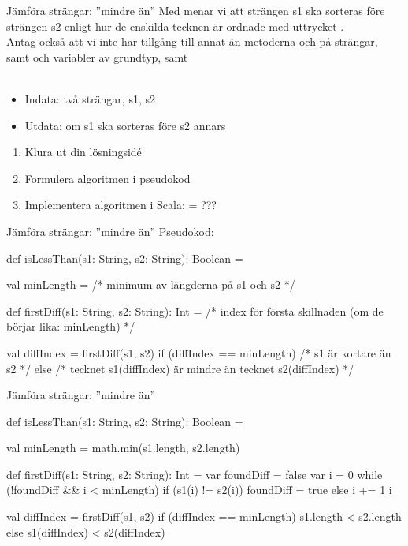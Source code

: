 \begin{Slide}{Jämföra strängar: ''mindre än''}\SlideFontSmall
Med  menar vi att strängen s1 ska sorteras före strängen s2 enligt hur de enskilda tecknen är ordnade med uttrycket . \\
Antag också att vi inte har tillgång till annat än metoderna  och  på strängar, samt   och variabler av grundtyp, samt 
\\\\
\begin{itemize}
\item Indata: två strängar, s1, s2
\item Utdata:  om s1 ska sorteras före s2 annars 
\end{itemize}
\begin{enumerate}
\item Klura ut din lösningsidé
\item Formulera algoritmen i pseudokod
\item Implementera algoritmen i Scala:  = ???
\end{enumerate}
\end{Slide}

\begin{Slide}{Jämföra strängar: ''mindre än''}\SlideFontSmall
Pseudokod:
\begin{Code}
def isLessThan(s1: String, s2: String): Boolean = {

  val minLength = /* minimum av längderna på s1 och s2 */

  def firstDiff(s1: String, s2: String): Int =
    /* index för första skillnaden (om de börjar lika: minLength) */

  val diffIndex = firstDiff(s1, s2)
  if (diffIndex == minLength) /* s1 är kortare än s2 */
  else /* tecknet s1(diffIndex) är mindre än tecknet s2(diffIndex) */
}
\end{Code}
\end{Slide}

\begin{Slide}{Jämföra strängar: ''mindre än''}\SlideFontSmall
\begin{Code}
def isLessThan(s1: String, s2: String): Boolean = {

  val minLength = math.min(s1.length, s2.length)

  def firstDiff(s1: String, s2: String): Int = {
    var foundDiff = false
    var i = 0
    while (!foundDiff && i < minLength) {
      if (s1(i) != s2(i)) foundDiff = true
      else i += 1
    }
    i
  }

  val diffIndex = firstDiff(s1, s2)
  if (diffIndex == minLength) s1.length < s2.length
  else s1(diffIndex) < s2(diffIndex)
}
\end{Code}
\end{Slide}

